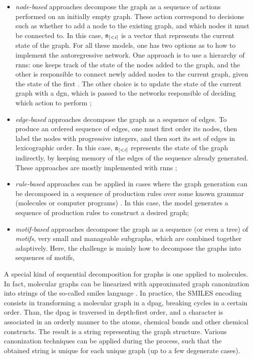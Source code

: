\begin{itemize}
    \item \emph{node-based} approaches decompose the graph as a sequence of actions performed on an initially empty graph. These action correspond to decisions such as whether to add a node to the existing graph, and which nodes it must be connected to. In this case, $\mathtt{s}_{[<i]}$ is a vector that represents the current state of the graph. For all these models, one has two options as to how to implement the autoregressive network. One approach is to use a hierarchy of \glspl{rnn}: one keeps track of the state of the nodes added to the graph, and the other is responsible to connect newly added nodes to the current graph, given the state of the first \citep{you2018graphrnn}. The other choice is to update the state of the current graph with a \gls{dgn}, which is passed to the networks responsible of deciding which action to perform \citep{li2018learningdeepgmg};
    \item \emph{edge-based} approaches decompose the graph as a sequence of edges. To produce an ordered sequence of edges, one must first order its nodes, then label the nodes with progressive integers, and then sort its set of edges in lexicographic order. In this case, $\mathtt{s}_{[<i]}$ represents the state of the graph indirectly, by keeping memory of the edges of the sequence already generated. These approaches are mostly implemented with \glspl{rnn} \citep{goyal2020graphgen,bacciu2019edgegraphgenrnn};
    \item \emph{rule-based} approaches can be applied in cases where the graph generation can be decomposed in a sequence of production rules over some known grammar (\eg molecules or computer programs) \citep{kusner2017grammarvae,dai2018sdvae}. In this case, the model generates a sequence of production rules to construct a desired graph;
    \item \emph{motif-based} approaches decompose the graph as a sequence (or even a tree) of \emph{motifs}, \ie very small and manageable subgraphs, which are combined together adaptively. Here, the challenge is mainly how to decompose the graphs into sequences of motifs,
\end{itemize}
A special kind of sequential decomposition for graphs is one applied to molecules. In fact, molecular graphs can be linearized with approximated graph canonization into strings of the so-called \gls{smiles} language \citep{weininger1988smiles}. In practice, the SMILES encoding consists in transforming a molecular graph in a \gls{dpag}, breaking cycles in a certain order. Than, the \gls{dpag} is traversed in depth-first order, and a character is associated in an orderly manner to the atoms, chemical bonds and other chemical constructs. The result is a string representing the graph structure. Various canonization techniques can be applied during the process, such that the obtained string is unique for each unique graph (up to a few degenerate cases).

